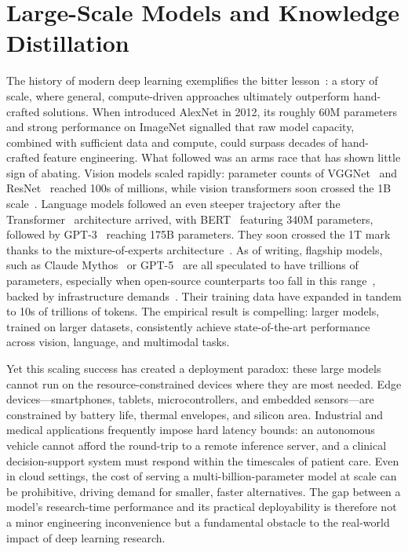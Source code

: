 \section{Large-Scale Models and Knowledge Distillation} \label{sec:11-introduction-deployment}
\begin{foldable}
  The history of modern deep learning exemplifies the bitter lesson~\cite{sutton2019bitter}: a story of scale, where general, compute-driven approaches ultimately outperform hand-crafted solutions.
  When \cite{krizhevsky2012imagenet} introduced AlexNet in 2012, its roughly 60M parameters and strong performance on ImageNet signalled that raw model capacity, combined with sufficient data and compute, could surpass decades of hand-crafted feature engineering.
  What followed was an arms race that has shown little sign of abating.
  Vision models scaled rapidly: parameter counts of VGGNet~\cite{simonyan2014very} and ResNet~\cite{he2016deep} reached 100s of millions, while vision transformers soon crossed the 1B scale~\cite{dosovitskiy2020image,zhai2022scaling}.
  Language models followed an even steeper trajectory after the Transformer~\cite{vaswani2017attention} architecture arrived, with BERT~\cite{devlin2019bert} featuring 340M parameters, followed by GPT-3~\cite{brown2020language} reaching 175B parameters.
  They soon crossed the 1T mark thanks to the mixture-of-experts architecture~\cite{fedus2022switch}.
  As of writing, flagship models, such as Claude Mythos~\cite{anthropic2026assessing} or GPT-5~\cite{openai2025introducing} are all speculated to have trillions of parameters, especially when open-source counterparts too fall in this range~\cite{meta2025llama4,yang2025qwen3}, backed by infrastructure demands~\cite{nvidia2024demistifying}.
  Their training data have expanded in tandem to 10s of trillions of tokens.
  The empirical result is compelling: larger models, trained on larger datasets, consistently achieve state-of-the-art performance across vision, language, and multimodal tasks.
\end{foldable}

\begin{foldable}
  Yet this scaling success has created a deployment paradox: these large models cannot run on the resource-constrained devices where they are most needed.
  Edge devices---smartphones, tablets, microcontrollers, and embedded sensors---are constrained by battery life, thermal envelopes, and silicon area.
  Industrial and medical applications frequently impose hard latency bounds: an autonomous vehicle cannot afford the round-trip to a remote inference server, and a clinical decision-support system must respond within the timescales of patient care.
  Even in cloud settings, the cost of serving a multi-billion-parameter model at scale can be prohibitive, driving demand for smaller, faster alternatives.
  The gap between a model's research-time performance and its practical deployability is therefore not a minor engineering inconvenience but a fundamental obstacle to the real-world impact of deep learning research.
\end{foldable}

